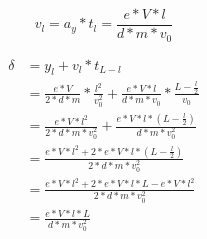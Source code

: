 \documentclass[12pt,fleqn]{article}
\begin{document}
\[v_l=a_y*t_l=\frac{e*V*l}{d*m*v_0}\tag{velocidad en y cuando sale de las placas}\]

\begin{align*}
  \delta&=y_l+v_l*t_{L-l}\\
        &=\frac{e*V}{2*d*m}*\frac{l^2}{v_0^2}+\frac{e*V*l}{d*m*v_0}*\frac{L-\frac{l}{2}}{v_0}\\
        &=\frac{e*V*l^2}{2*d*m*v_0^2}+\frac{e*V*l*(L-\frac{l}{2})}{d*m*v_0^2}\\
        &=\frac{e*V*l^2+2*e*V*l*(L-\frac{l}{2})}{2*d*m*v_0^2}\\
        &=\frac{e*V*l^2+2*e*V*l*L-e*V*l^2}{2*d*m*v_0^2}\\
        &=\frac{e*V*l*L}{d*m*v_0^2}
\end{align*}
\end{document}
